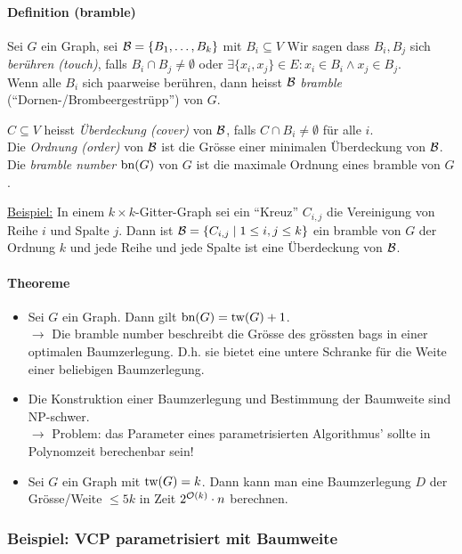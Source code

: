\paragraph{Definition (bramble)}
Sei $G$ ein Graph, sei $\mathcal{B} = \{B_1, \dots, B_k\}$ mit $B_i \subseteq V$
Wir sagen dass $B_i, B_j$ sich \emph{berühren (touch)}, falls
$B_i \cap B_j \neq \emptyset$ oder $\exists \{x_i, x_j\} \in E : x_i \in B_i \wedge x_j \in B_j$.
\\
Wenn alle $B_i$ sich paarweise berühren, dann heisst $\mathcal{B}$ \emph{bramble} (``Dornen-/Brombeergestrüpp'') von $G$.

$C \subseteq V$ heisst \emph{Überdeckung (cover)} von $\mathcal{B}$, falls $C \cap B_i \neq \emptyset$ für alle $i$.
\\
Die \emph{Ordnung (order)} von $\mathcal{B}$ ist die Grösse einer minimalen Überdeckung von $\mathcal{B}$.
\\
Die \emph{bramble number} $\text{bn}(G)$ von $G$ ist die maximale Ordnung eines bramble von $G$.

\underline{Beispiel:}
In einem $k \times k$-Gitter-Graph sei ein ``Kreuz'' $C_{i,j}$ die Vereinigung von Reihe $i$ und Spalte $j$.
Dann ist $\mathcal{B} = \{C_{i,j} \; | \; 1 \leq i,j \leq k \}$ ein bramble von $G$ der Ordnung $k$
und jede Reihe und jede Spalte ist eine Überdeckung von $\mathcal{B}$.

\paragraph{Theoreme}
\begin{itemize}
    \item Sei $G$ ein Graph. Dann gilt $\text{bn}(G) = \text{tw}(G) + 1$. \\
    $\longrightarrow$ Die bramble number beschreibt die Grösse des grössten bags in einer optimalen Baumzerlegung.
    D.h. sie bietet eine untere Schranke für die Weite einer beliebigen Baumzerlegung.
    \item Die Konstruktion einer Baumzerlegung und Bestimmung der Baumweite sind NP-schwer. \\
    $\longrightarrow$ Problem: das Parameter eines parametrisierten Algorithmus' sollte in Polynomzeit berechenbar sein!
    \item Sei $G$ ein Graph mit $\text{tw}(G)=k$. Dann kann man eine Baumzerlegung $D$ der Grösse/Weite $\leq 5k$
    in Zeit $2^{\mathcal{O}(k)} \cdot n$ berechnen.
\end{itemize}

\subsubsection{Beispiel: VCP parametrisiert mit Baumweite}

